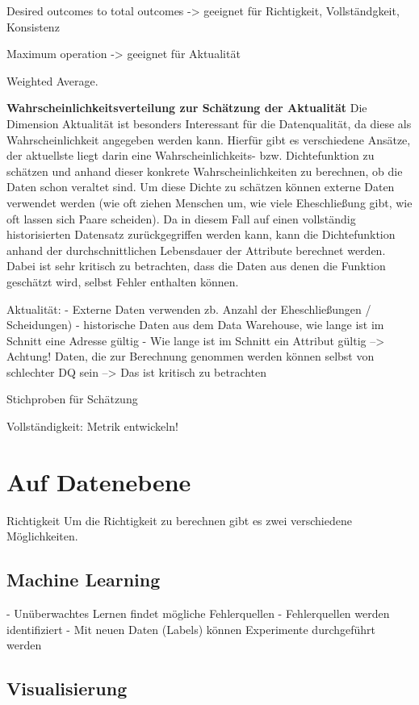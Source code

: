 Desired outcomes to total outcomes 
-> geeignet für Richtigkeit, Vollständgkeit, Konsistenz


Maximum operation
-> geeignet für Aktualität

Weighted Average. 

\textbf{Wahrscheinlichkeitsverteilung zur Schätzung der Aktualität}
Die Dimension Aktualität ist besonders Interessant für die Datenqualität, da diese als Wahrscheinlichkeit angegeben werden kann.
Hierfür gibt es verschiedene Ansätze, der aktuellste liegt darin eine Wahrscheinlichkeits- bzw. Dichtefunktion zu schätzen und anhand dieser konkrete Wahrscheinlichkeiten zu berechnen, ob die Daten schon veraltet sind.
Um diese Dichte zu schätzen können externe Daten verwendet werden (wie oft ziehen Menschen um, wie viele Eheschließung gibt, wie oft lassen sich Paare scheiden).
Da in diesem Fall auf einen vollständig historisierten Datensatz zurückgegriffen werden kann, kann die Dichtefunktion anhand der durchschnittlichen Lebensdauer der Attribute berechnet werden.
Dabei ist sehr kritisch zu betrachten, dass die Daten aus denen die Funktion geschätzt wird, selbst Fehler enthalten können. 

Aktualität:
- Externe Daten verwenden zb. Anzahl der Eheschließungen / Scheidungen) 
- historische Daten aus dem Data Warehouse, wie lange ist im Schnitt eine Adresse gültig
- Wie lange ist im Schnitt ein Attribut gültig
--> Achtung! Daten, die zur Berechnung genommen werden können selbst von schlechter DQ sein
--> Das ist kritisch zu betrachten


Stichproben für Schätzung


Vollständigkeit: Metrik entwickeln!



\section{Auf Datenebene}


Richtigkeit
Um die Richtigkeit zu berechnen gibt es zwei verschiedene Möglichkeiten. 

\subsection{Machine Learning}
- Unüberwachtes Lernen findet mögliche Fehlerquellen
- Fehlerquellen werden identifiziert
- Mit neuen Daten (Labels) können Experimente durchgeführt werden 


\subsection{Visualisierung}

